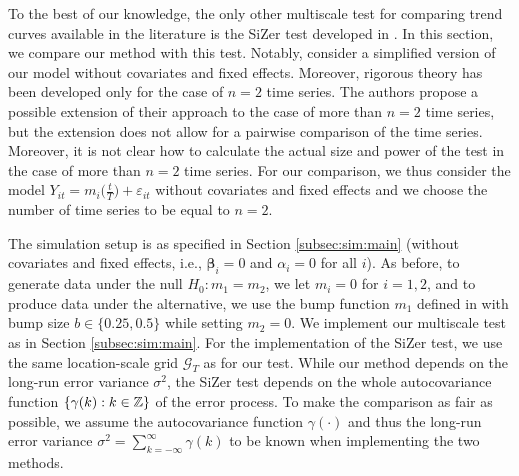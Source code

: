 \documentclass[12pt]{article}
\makeatletter
\renewcommand{\eqref}[1]{\tagform@{\ref{#1}}}
\makeatother
\begin{document}
To the best of our knowledge, the only other multiscale test for comparing trend curves available in the literature is the SiZer test developed in \cite{Park2009}. In this section, we compare our method with this test. Notably, \cite{Park2009} consider a simplified version of our model without covariates and fixed effects. Moreover, rigorous theory has been developed only for the case of $n=2$ time series. The authors propose a possible extension of their approach to the case of more than $n=2$ time series, but the extension does not allow for a pairwise comparison of the time series. Moreover, it is not clear how to calculate the actual size and power of the test in the case of more than $n=2$ time series. For our comparison, we thus consider the model $Y_{it} = m_i\big(\frac{t}{T}\big) + \varepsilon_{it}$ without covariates and fixed effects and we choose the number of time series to be equal to $n=2$. 


\pagebreak
The simulation setup is as specified in Section \ref{subsec:sim:main} (without covariates and fixed effects, i.e., $\boldsymbol{\beta}_i = 0$ and $\alpha_i = 0$ for all $i$).
As before, to generate data under the null $H_0: m_1 = m_2$, we let $m_i = 0$ for $i=1, 2$, and to produce data under the alternative, we use the bump function $m_1$ defined in \eqref{eq:bump-fct} with bump size $b \in \{ 0.25, 0.5 \}$ while setting $m_2 = 0$.
We implement our multiscale test as in Section \ref{subsec:sim:main}. For the implementation of the SiZer test, we use the same location-scale grid $\mathcal{G}_T$ as for our test. While our method depends on the long-run error variance $\sigma^2$, the SiZer test depends on the whole autocovariance function $\{ \gamma(k): k \in \mathbb{Z}\}$ of the error process. To make the comparison as fair as possible, we assume the autocovariance function $\gamma(\cdot)$ and thus the long-run error variance $\sigma^2 = \sum_{k=-\infty}^\infty \gamma(k)$ to be known when implementing the two methods.
\end{document}
